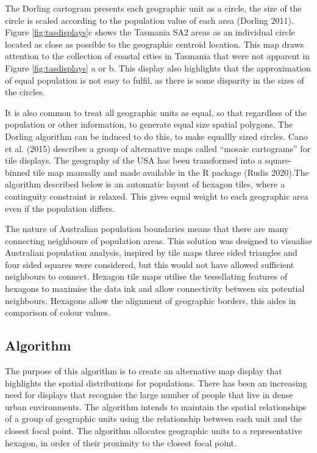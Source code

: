 The Dorling cartogram presents each geographic unit as a circle, the size of the circle is scaled according to the population value of each area (Dorling 2011). Figure \ref{fig:tasdisplays}c shows the Tasmania SA2 areas as an individual circle located as close as possible to the geographic centroid location. This map draws attention to the collection of coastal cities in Tasmania that were not apparent in Figure \ref{fig:tasdisplays} a or b. This display also highlights that the approximation of equal population is not easy to fulfil, as there is some disparity in the sizes of the circles.

It is also common to treat all geographic units as equal, so that regardless of the population or other information, to generate equal size spatial polygons. The Dorling algorithm can be induced to do this, to make equallly sized circles. Cano et al. (2015) describes a group of alternative maps called ``mosaic cartograms'' for tile displays. The geography of the USA has been transformed into a square-binned tile map manually and made available in the R package  (Rudis 2020).The algorithm described below is an automatic layout of hexagon tiles, where a continguity constraint is relaxed. This gives equal weight to each geographic area even if the population differs.

The nature of Australian population boundaries means that there are many connecting neighbours of population areas. This solution was designed to visualise Australian population analysis, inspired by tile maps three sided triangles and four sided squares were considered, but this would not have allowed sufficient neighbours to connect. Hexagon tile maps utilise the tessellating features of hexagons to maximise the data ink and allow connectivity between six potential neighbours. Hexagons allow the alignment of geographic borders, this aides in comparison of colour values.

\hypertarget{algorithm}{%
\subsection{Algorithm}\label{algorithm}}

The purpose of this algorithm is to create an alternative map display that highlights the spatial distributions for populations. There has been an increasing need for displays that recognise the large number of people that live in dense urban environments. The algorithm intends to maintain the spatial relationships of a group of geographic units using the relationship between each unit and the closest focal point. The algorithm allocates geographic units to a representative hexagon, in order of their proximity to the closest focal point.

